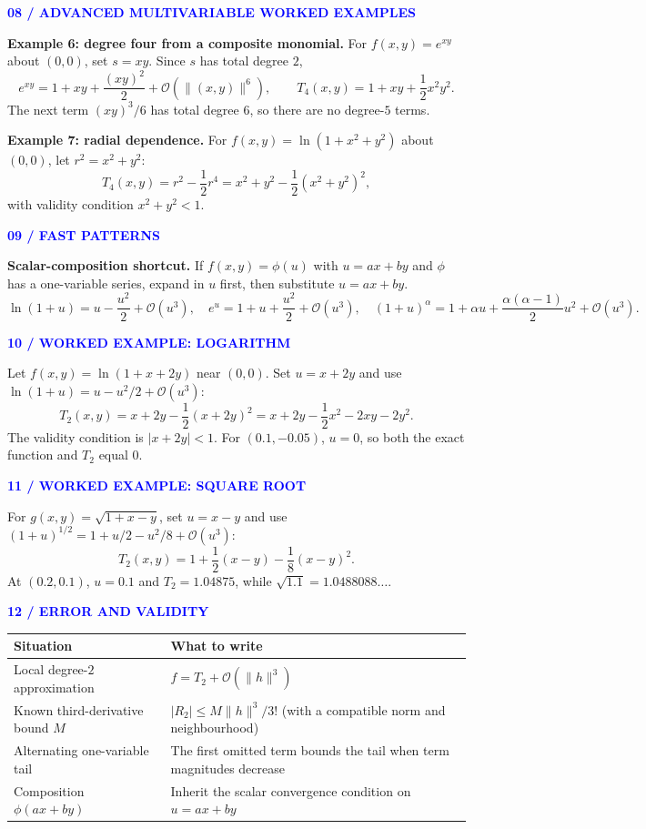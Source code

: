 \documentclass[10.5pt]{article}
\newcommand{\tagline}[1]{\par\medskip\textcolor{blue}{\sffamily\footnotesize\bfseries #1}\par\vspace{1pt}}
\begin{document}
\tagline{08 / ADVANCED MULTIVARIABLE WORKED EXAMPLES}
\textbf{Example 6: degree four from a composite monomial.} For $f(x,y)=e^{xy}$ about $(0,0)$, set $s=xy$. Since $s$ has total degree $2$,
\[
e^{xy}=1+xy+\frac{(xy)^2}{2}+\mathcal O(\|(x,y)\|^6),\qquad
\boxed{T_4(x,y)=1+xy+\frac12x^2y^2.}
\]
The next term $(xy)^3/6$ has total degree $6$, so there are no degree-$5$ terms.

\textbf{Example 7: radial dependence.} For $f(x,y)=\ln(1+x^2+y^2)$ about $(0,0)$, let $r^2=x^2+y^2$:
\[
\boxed{T_4(x,y)=r^2-\frac12r^4=x^2+y^2-\frac12(x^2+y^2)^2,}
\]
with validity condition $x^2+y^2<1$.
\newpage
\tagline{09 / FAST PATTERNS}
\begin{orangebox}
\textbf{Scalar-composition shortcut.} If $f(x,y)=\phi(u)$ with $u=ax+by$ and $\phi$ has a one-variable series, expand in $u$ first, then substitute $u=ax+by$.
\[
\ln(1+u)=u-\frac{u^2}{2}+\mathcal O(u^3),\quad e^u=1+u+\frac{u^2}{2}+\mathcal O(u^3),\quad (1+u)^\alpha=1+\alpha u+\frac{\alpha(\alpha-1)}2u^2+\mathcal O(u^3).
\]
\end{orangebox}
\tagline{10 / WORKED EXAMPLE: LOGARITHM}
Let $f(x,y)=\ln(1+x+2y)$ near $(0,0)$. Set $u=x+2y$ and use $\ln(1+u)=u-u^2/2+\mathcal O(u^3)$:
\[
\boxed{T_2(x,y)=x+2y-\frac12(x+2y)^2
=x+2y-\frac12x^2-2xy-2y^2.}
\]
The validity condition is $|x+2y|<1$. For $(0.1,-0.05)$, $u=0$, so both the exact function and $T_2$ equal $0$.
\tagline{11 / WORKED EXAMPLE: SQUARE ROOT}
For $g(x,y)=\sqrt{1+x-y}$, set $u=x-y$ and use $(1+u)^{1/2}=1+u/2-u^2/8+\mathcal O(u^3)$:
\[
\boxed{T_2(x,y)=1+\frac12(x-y)-\frac18(x-y)^2.}
\]
At $(0.2,0.1)$, $u=0.1$ and $T_2=1.04875$, while $\sqrt{1.1}=1.0488088\ldots$.
\tagline{12 / ERROR AND VALIDITY}
\begin{center}
\renewcommand{\arraystretch}{1.25}
\begin{tabular}{>{\raggedright\arraybackslash}p{.32\linewidth} p{.58\linewidth}}
\toprule
\textbf{Situation} & \textbf{What to write}\\\midrule
Local degree-$2$ approximation & $f=T_2+\mathcal O(\|h\|^3)$\\
Known third-derivative bound $M$ & $|R_2|\le M\|h\|^3/3!$ (with a compatible norm and neighbourhood)\\
Alternating one-variable tail & The first omitted term bounds the tail when term magnitudes decrease\\
Composition $\phi(ax+by)$ & Inherit the scalar convergence condition on $u=ax+by$\\
\bottomrule
\end{tabular}
\end{center}
\end{document}
